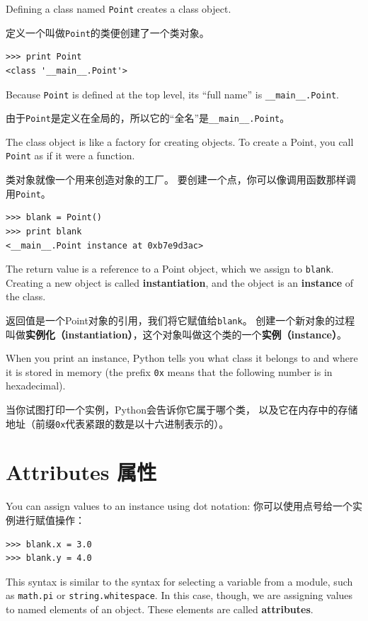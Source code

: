 \documentclass[10pt]{book}
\begin{document}
\begin{CJK}{UTF8}{gbsn}
Defining a class named {\tt Point} creates a class object.

定义一个叫做{\tt Point}的类便创建了一个类对象。

\begin{verbatim}
>>> print Point
<class '__main__.Point'>
\end{verbatim}
%
Because {\tt Point} is defined at the top level, its ``full
name'' is \verb"__main__.Point".

由于{\tt Point}是定义在全局的，所以它的``全名''是\verb"__main__.Point"。

The class object is like a factory for creating objects.  To create a
Point, you call {\tt Point} as if it were a function.

类对象就像一个用来创造对象的工厂。
要创建一个点，你可以像调用函数那样调用{\tt Point}。

\begin{verbatim}
>>> blank = Point()
>>> print blank
<__main__.Point instance at 0xb7e9d3ac>
\end{verbatim}
%
The return value is a reference to a Point object, which we
assign to {\tt blank}.  
Creating a new object is called
{\bf instantiation}, and the object is an {\bf instance} of
the class.

返回值是一个Point对象的引用，我们将它赋值给{\tt blank}。
创建一个新对象的过程叫做{\bf 实例化（instantiation）}，这个对象叫做这个类的一个{\bf 实例（instance）}。

When you print an instance, Python tells you what class it
belongs to and where it is stored in memory (the prefix
{\tt 0x} means that the following number is in hexadecimal).

当你试图打印一个实例，Python会告诉你它属于哪个类，
以及它在内存中的存储地址（前缀{\tt 0x}代表紧跟的数是以十六进制表示的）。

\section{Attributes 属性}
\label{attributes}

You can assign values to an instance using dot notation:
你可以使用点号给一个实例进行赋值操作：

\begin{verbatim}
>>> blank.x = 3.0
>>> blank.y = 4.0
\end{verbatim}
%
This syntax is similar to the syntax for selecting a variable from a
module, such as {\tt math.pi} or {\tt string.whitespace}.  In this case,
though, we are assigning values to named elements of an object.
These elements are called {\bf attributes}.


\end{CJK}
\end{document}
